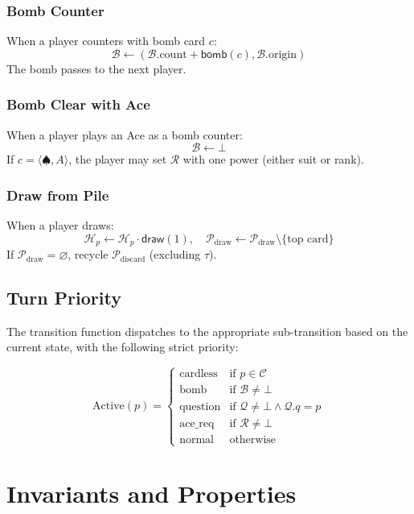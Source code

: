 \documentclass[11pt,a4paper,twoside]{article}
\theoremstyle{definition}
\theoremstyle{remark}
\newcommand{\Card}[2]{\ensuremath{\langle #1, #2 \rangle}}
\newcommand{\Hand}{\ensuremath{\mathcal{H}}}
\newcommand{\Pile}{\ensuremath{\mathcal{P}}}
\newcommand{\Top}{\ensuremath{\tau}}
\newcommand{\Cardless}{\ensuremath{\mathcal{C}}}
\newcommand{\Bomb}{\ensuremath{\mathcal{B}}}
\newcommand{\Quest}{\ensuremath{\mathcal{Q}}}
\newcommand{\CardReq}{\ensuremath{\mathcal{R}}}
\newcommand{\func}[1]{\ensuremath{\mathsf{#1}}}
\begin{document}
\subsubsection{Bomb Counter}

When a player counters with bomb card $c$:
\[
\Bomb \leftarrow (\Bomb.\text{count} + \func{bomb}(c), \Bomb.\text{origin})
\]
The bomb passes to the next player.

\subsubsection{Bomb Clear with Ace}

When a player plays an Ace as a bomb counter:
\[
\Bomb \leftarrow \bot
\]
If $c = \Card{\spadesuit}{A}$, the player may set $\CardReq$ with one power
(either suit or rank).

\subsubsection{Draw from Pile}

When a player draws:
\[
\Hand_p \leftarrow \Hand_p \cdot \func{draw}(1),\quad
\Pile_{\text{draw}} \leftarrow \Pile_{\text{draw}} \setminus \{\text{top card}\}
\]
If $\Pile_{\text{draw}} = \varnothing$, recycle $\Pile_{\text{discard}}$
(excluding $\Top$).

\subsection{Turn Priority}

The transition function dispatches to the appropriate sub-transition based
on the current state, with the following strict priority:

\[
\text{Active}(p) = \begin{cases}
  \text{cardless}   & \text{if } p \in \Cardless \\
  \text{bomb}       & \text{if } \Bomb \neq \bot \\
  \text{question}   & \text{if } \Quest \neq \bot \land \Quest.q = p \\
  \text{ace\_req}   & \text{if } \CardReq \neq \bot \\
  \text{normal}     & \text{otherwise}
\end{cases}
\]

\section{Invariants and Properties}
\label{sec:invariants}
\end{document}

